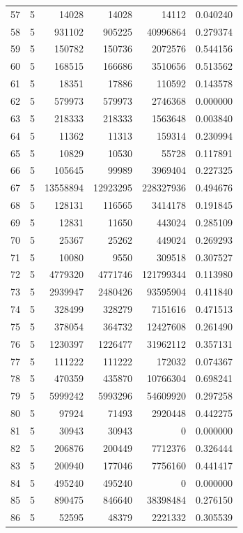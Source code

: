 \begin{longtable}{rrrrrr}
57 & 5 & 14028 & 14028 & 14112 & 0.040240\\
58 & 5 & 931102 & 905225 & 40996864 & 0.279374\\
59 & 5 & 150782 & 150736 & 2072576 & 0.544156\\
60 & 5 & 168515 & 166686 & 3510656 & 0.513562\\
61 & 5 & 18351 & 17886 & 110592 & 0.143578\\
62 & 5 & 579973 & 579973 & 2746368 & 0.000000\\
63 & 5 & 218333 & 218333 & 1563648 & 0.003840\\
64 & 5 & 11362 & 11313 & 159314 & 0.230994\\
65 & 5 & 10829 & 10530 & 55728 & 0.117891\\
66 & 5 & 105645 & 99989 & 3969404 & 0.227325\\
67 & 5 & 13558894 & 12923295 & 228327936 & 0.494676\\
68 & 5 & 128131 & 116565 & 3414178 & 0.191845\\
69 & 5 & 12831 & 11650 & 443024 & 0.285109\\
70 & 5 & 25367 & 25262 & 449024 & 0.269293\\
71 & 5 & 10080 & 9550 & 309518 & 0.307527\\
72 & 5 & 4779320 & 4771746 & 121799344 & 0.113980\\
73 & 5 & 2939947 & 2480426 & 93595904 & 0.411840\\
74 & 5 & 328499 & 328279 & 7151616 & 0.471513\\
75 & 5 & 378054 & 364732 & 12427608 & 0.261490\\
76 & 5 & 1230397 & 1226477 & 31962112 & 0.357131\\
77 & 5 & 111222 & 111222 & 172032 & 0.074367\\
78 & 5 & 470359 & 435870 & 10766304 & 0.698241\\
79 & 5 & 5999242 & 5993296 & 54609920 & 0.297258\\
80 & 5 & 97924 & 71493 & 2920448 & 0.442275\\
81 & 5 & 30943 & 30943 & 0 & 0.000000\\
82 & 5 & 206876 & 200449 & 7712376 & 0.326444\\
83 & 5 & 200940 & 177046 & 7756160 & 0.441417\\
84 & 5 & 495240 & 495240 & 0 & 0.000000\\
85 & 5 & 890475 & 846640 & 38398484 & 0.276150\\
86 & 5 & 52595 & 48379 & 2221332 & 0.305539\\

\end{longtable}
